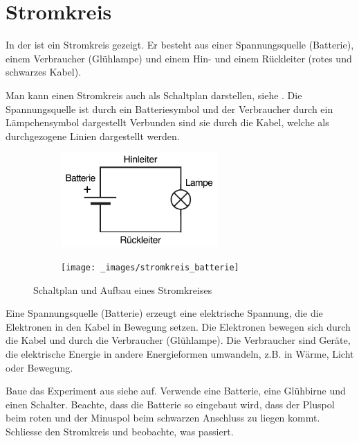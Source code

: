 
\newpage
\chapter{Stromkreis}

In der  ist ein Stromkreis gezeigt.
Er besteht aus einer Spannungsquelle (Batterie), einem Verbraucher (Glühlampe)
und einem Hin- und einem Rückleiter (rotes und schwarzes Kabel).

Man kann einen Stromkreis auch als Schaltplan darstellen, siehe .
Die Spannungsquelle ist durch ein Batteriesymbol und der Verbraucher durch ein
Lämpchensymbol dargestellt Verbunden sind sie durch die Kabel, welche
als durchgezogene Linien dargestellt werden.

\begin{figure}[h!]
\centering
    \begin{subfigure}[b]{0.46\textwidth}
    \centering
    \includegraphics[width=6cm]{_images/stromkreis_schaltplan}
    \caption{\label{fig:circuit_schematic}}
    \end{subfigure}
\quad
    \begin{subfigure}[b]{0.46\textwidth}
    \centering
    \texttt{[image: \_images/stromkreis\_batterie]}
    \caption{\label{fig:circuit_battery}}
    \end{subfigure}

    \caption{Schaltplan und Aufbau eines Stromkreises}
\end{figure}

Eine Spannungsquelle (Batterie) erzeugt eine elektrische Spannung, die
die Elektronen in den Kabel in Bewegung setzen. Die Elektronen bewegen sich durch die
Kabel und durch die Verbraucher (Glühlampe). Die Verbraucher sind Geräte, die
elektrische Energie in andere Energieformen umwandeln, z.B. in Wärme,
Licht oder Bewegung.





\newpage
{}

Baue das Experiment aus siehe  auf. Verwende eine Batterie, eine Glühbirne und einen Schalter.
Beachte, dass die Batterie so eingebaut wird, dass der Pluspol beim roten und der Minuspol
beim schwarzen Anschluss zu liegen kommt. Schliesse den Stromkreis und beobachte, was passiert.

